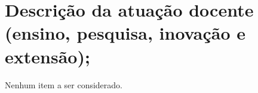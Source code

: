 \section{Descrição da atuação docente (ensino, pesquisa, inovação e extensão);}

Nenhum item a ser considerado.